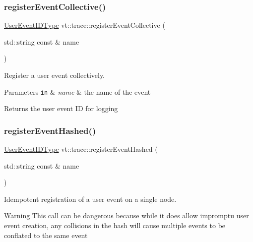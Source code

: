 \subsubsection{\texorpdfstring{register\+Event\+Collective()}{registerEventCollective()}}
{\footnotesize\ttfamily \hyperlink{namespacevt_1_1trace_a5908920d051c144c89f17c69ed262350}{User\+Event\+I\+D\+Type} vt\+::trace\+::register\+Event\+Collective (\begin{DoxyParamCaption}\item[{std\+::string const \&}]{name }\end{DoxyParamCaption})}



Register a user event collectively. 


\begin{DoxyParams}[1]{Parameters}
\mbox{\tt in}  & {\em name} & the name of the event\\
\hline
\end{DoxyParams}
\begin{DoxyReturn}{Returns}
the user event ID for logging 
\end{DoxyReturn}
\mbox{\label{namespacevt_1_1trace_ad1f604656798749839b36d1d29def59e}} 
\subsubsection{\texorpdfstring{register\+Event\+Hashed()}{registerEventHashed()}}
{\footnotesize\ttfamily \hyperlink{namespacevt_1_1trace_a5908920d051c144c89f17c69ed262350}{User\+Event\+I\+D\+Type} vt\+::trace\+::register\+Event\+Hashed (\begin{DoxyParamCaption}\item[{std\+::string const \&}]{name }\end{DoxyParamCaption})}



Idempotent registration of a user event on a single node. 

\begin{DoxyWarning}{Warning}
This call can be dangerous because while it does allow impromptu user event creation, any collisions in the hash will cause multiple events to be conflated to the same event
\end{DoxyWarning}

